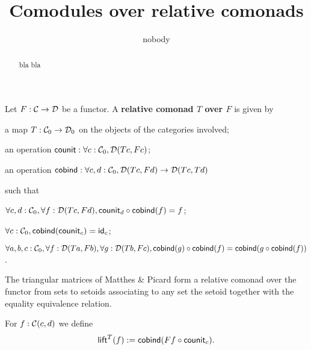 \documentclass{amsart}
\author{nobody}
\title{Comodules over relative comonads}
\newcommand{\fat}[1]{\textbf{#1}}
\begin{document}
\begin{abstract}
  bla bla
\end{abstract}

\maketitle



\begin{definition}
  Let $F:\C\to\D$ be a functor. A \fat{relative comonad $T$ over $F$} is given by
  \begin{packitem}
   \item a map $T:\C_0 \to \D_0$ on the objects of the categories involved;
   \item an operation $\counit : \forall c : \C_0, \D(Tc,Fc)$;
   \item an operation $\cobind: \forall c,d:\C_0, \D(Tc,Fd) \to \D(Tc,Td)$
  \end{packitem}
  such that 
  \begin{packitem}
   \item $\forall c,d:\C_0, \forall f:\D(Tc,Fd), \comp{\cobind(f)}{\counit_d} = f$;
   \item $\forall c : \C_0, \cobind(\counit_c) = \id_c$;
   \item $\forall a,b,c:\C_0, \forall f : \D(Ta,Fb),\forall g:\D(Tb,Fc), \\
        \comp{\cobind(f)}{\cobind(g)} = \cobind(\comp{\cobind(f)}{g})$.
  \end{packitem} 
\end{definition}

\begin{example}
  The triangular matrices of Matthes \& Picard form a relative comonad over the functor from sets to setoids
  associating to any set the setoid together with the equality equivalence relation.
\end{example}


\begin{definition}
 For $f : \C(c,d)$ we define
  \[ \lift^T(f) := \cobind(\comp{\counit_c}{Ff}) .  \]
\end{definition}
\end{document}
